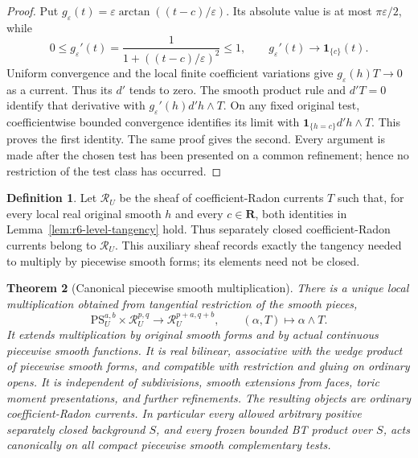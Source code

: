 \documentclass[11pt,a4paper]{article}
\numberwithin{equation}{section}
\newtheorem{theorem}{Theorem}[section]
\theoremstyle{definition}
\newtheorem{definition}[theorem]{Definition}
\theoremstyle{remark}
\begin{document}
\begin{proof}
Put $g_\varepsilon(t)=\varepsilon\arctan((t-c)/\varepsilon)$.
Its absolute value is at most $\pi\varepsilon/2$, while
\[
 0\leq g_\varepsilon'(t)
    =\frac{1}{1+((t-c)/\varepsilon)^2}\leq1,
 \qquad
 g_\varepsilon'(t)\longrightarrow\mathbf1_{\{c\}}(t).
\]
Uniform convergence and the local finite coefficient variations
give $g_\varepsilon(h)T\to0$ as a current. Thus its $d'$ tends
to zero. The smooth product rule and $d'T=0$ identify that
derivative with $g_\varepsilon'(h)d'h\wedge T$.
On any fixed original test, coefficientwise bounded convergence
identifies its limit with $\mathbf1_{\{h=c\}}d'h\wedge T$.
This proves the first identity. The same proof gives the second.
Every argument is made after the chosen test has been presented
on a common refinement; hence no restriction of the test class
has occurred.
\end{proof}

\begin{definition}
Let $\mathscr R_U$ be the sheaf of coefficient-Radon currents $T$
such that, for every local real original smooth $h$ and every
$c\in\mathbf R$, both identities in
Lemma~\ref{lem:r6-level-tangency} hold. Thus separately closed
coefficient-Radon currents belong to $\mathscr R_U$.
This auxiliary sheaf records exactly the tangency needed to
multiply by piecewise smooth forms; its elements need not be closed.
\end{definition}

\begin{theorem}[Canonical piecewise smooth multiplication]
\label{thm:r6-pws-multiplication}
There is a unique local multiplication obtained from tangential
restriction of the smooth pieces,
\[
 \mathrm{PS}^{a,b}_U\times\mathscr R_U^{p,q}
       \longrightarrow\mathscr R_U^{p+a,q+b},
       \qquad(\alpha,T)\longmapsto\alpha\wedge T.
\]
It extends multiplication by original smooth forms and by actual
continuous piecewise smooth functions. It is real bilinear,
associative with the wedge product of piecewise smooth forms,
and compatible with restriction and gluing on ordinary opens.
It is independent of subdivisions, smooth extensions from
faces, toric moment presentations, and further refinements.
The resulting objects are ordinary coefficient-Radon currents.
In particular every allowed arbitrary positive separately
closed background $S$, and every frozen bounded BT product
over $S$, acts canonically on all compact piecewise smooth
complementary tests.
\end{theorem}
\end{document}
